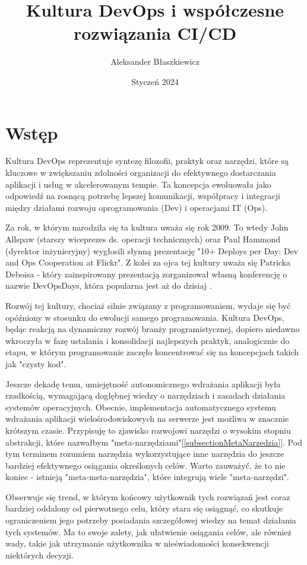 \documentclass{article}
\title{Kultura DevOps i współczesne rozwiązania CI/CD}
\author{Aleksander Błaszkiewicz}
\date{Styczeń 2024}
\begin{document}
\maketitle
\newpage
\tableofcontents
\newpage

\section{Wstęp}
Kultura DevOps reprezentuje syntezę filozofii, praktyk oraz narzędzi, które są kluczowe w zwiększaniu zdolności organizacji do efektywnego dostarczania aplikacji i usług w akcelerowanym tempie. Ta koncepcja ewoluowała jako odpowiedź na rosnącą potrzebę lepszej komunikacji, współpracy i integracji między działami rozwoju oprogramowania (Dev) i operacjami IT (Ops).

Za rok, w którym narodziła się ta kultura uważa się rok 2009. To wtedy John Allspaw (starszy wiceprezes ds. operacji technicznych) oraz Paul Hammond (dyrektor inżynieryjny) wygłosili słynną prezentację "10+ Deploys per Day: Dev and Ops Cooperation at Flickr"\cite{flickr}. Z kolei za ojca tej kultury uważa się Patricka Deboisa - który zainspirowany prezentacją zorganizował własną konferencję o nazwie DevOpsDays, która popularna jest aż do dzisiaj \cite{devOpsDays}.

Rozwój tej kultury, chociaż silnie związany z programowaniem, wydaje się być opóźniony w stosunku do ewolucji samego programowania. Kultura DevOps, będąc reakcją na dynamiczny rozwój branży programistycznej, dopiero niedawno wkroczyła w fazę ustalania i konsolidacji najlepszych praktyk, analogicznie do etapu, w którym programowanie zaczęło koncentrować się na koncepcjach takich jak "czysty kod".

Jeszcze dekadę temu, umiejętność autonomicznego wdrażania aplikacji była rzadkością, wymagającą dogłębnej wiedzy o narzędziach i zasadach działania systemów operacyjnych. Obecnie, implementacja automatycznego systemu wdrażania aplikacji wielośrodowiskowych na serwerze jest możliwa w znacznie krótszym czasie. Przypisuję to zjawisko rozwojowi narzędzi o wysokim stopniu abstrakcji, które nazwałbym "meta-narzędziami"[\ref{subsectionMetaNarzedzia}]. Pod tym terminem rozumiem narzędzia wykorzystujące inne narzędzia do jeszcze bardziej efektywnego osiągania określonych celów. Warto zauważyć, że to nie koniec - istnieją "meta-meta-narzędzia", które integrują wiele "meta-narzędzi".

Obserwuje się trend, w którym końcowy użytkownik tych rozwiązań jest coraz bardziej oddalony od pierwotnego celu, który stara się osiągnąć, co skutkuje ograniczeniem jego potrzeby posiadania szczegółowej wiedzy na temat działania tych systemów. Ma to swoje zalety, jak ułatwienie osiągania celów, ale również wady, takie jak utrzymanie użytkownika w nieświadomości konsekwencji niektórych decyzji.
\end{document}
